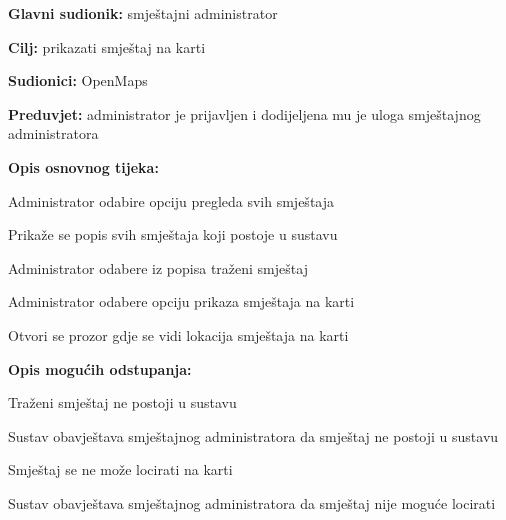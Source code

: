                         \noindent {}
					\begin{packed_item}
	
						\item \textbf{Glavni sudionik: }smještajni administrator
						\item  \textbf{Cilj:} prikazati smještaj na karti
						\item  \textbf{Sudionici:} OpenMaps
						\item  \textbf{Preduvjet:} administrator je prijavljen i dodijeljena mu je uloga smještajnog administratora
						\item  \textbf{Opis osnovnog tijeka:}
						
						\item[] \begin{packed_enum}
	
							\item Administrator odabire opciju pregleda svih smještaja
							\item Prikaže se popis svih smještaja koji postoje u sustavu
							\item Administrator odabere iz popisa traženi smještaj
							\item Administrator odabere opciju prikaza smještaja na karti
							\item Otvori se prozor gdje se vidi lokacija smještaja na karti
						\end{packed_enum}
						
						\item  \textbf{Opis mogućih odstupanja:}
						
						\item[] \begin{packed_item}
	
							\item[3.a] Traženi smještaj ne postoji u sustavu
							\item[] \begin{packed_enum}
								
								\item Sustav obavještava smještajnog administratora da smještaj ne postoji u sustavu
								
							\end{packed_enum}
							\item[4.a] Smještaj se ne može locirati na karti
							\item[] \begin{packed_enum}
								
								\item Sustav obavještava smještajnog administratora da smještaj nije moguće locirati
								
							\end{packed_enum}
							
						\end{packed_item}
					\end{packed_item}

